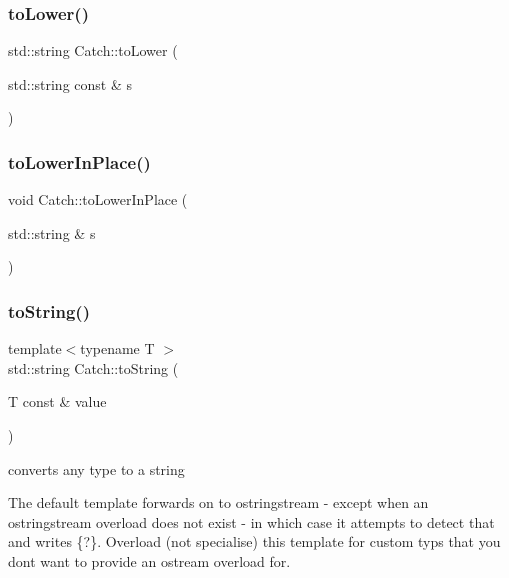 \hypertarget{namespace_catch_ac036a17412d318598ffda8e1fe7a1177}{}\label{namespace_catch_ac036a17412d318598ffda8e1fe7a1177} 
\subsubsection{\texorpdfstring{to\+Lower()}{toLower()}}
{\footnotesize\ttfamily std\+::string Catch\+::to\+Lower (\begin{DoxyParamCaption}\item[{std\+::string const \&}]{s }\end{DoxyParamCaption})}

\hypertarget{namespace_catch_a0760dbe87d090a55a35414db57d272c4}{}\label{namespace_catch_a0760dbe87d090a55a35414db57d272c4} 
\subsubsection{\texorpdfstring{to\+Lower\+In\+Place()}{toLowerInPlace()}}
{\footnotesize\ttfamily void Catch\+::to\+Lower\+In\+Place (\begin{DoxyParamCaption}\item[{std\+::string \&}]{s }\end{DoxyParamCaption})}

\hypertarget{namespace_catch_adbd1730f961da94d9ed284f70fd7a28b}{}\label{namespace_catch_adbd1730f961da94d9ed284f70fd7a28b} 
\subsubsection{\texorpdfstring{to\+String()}{toString()}\hspace{0.1cm}{\footnotesize\ttfamily [1/17]}}
{\footnotesize\ttfamily template$<$typename T $>$ \\
std\+::string Catch\+::to\+String (\begin{DoxyParamCaption}\item[{T const \&}]{value }\end{DoxyParamCaption})}



converts any type to a string 

The default template forwards on to ostringstream -\/ except when an ostringstream overload does not exist -\/ in which case it attempts to detect that and writes \{?\}. Overload (not specialise) this template for custom typs that you don\textquotesingle{}t want to provide an ostream overload for. 

